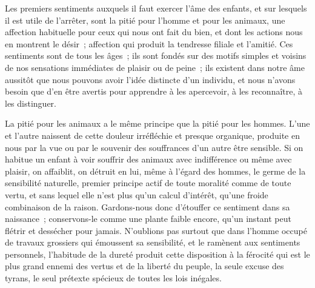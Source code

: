 	{Les premiers sentiments auxquels il faut exercer l'âme des enfants, et sur lesquels il est utile de l'arrêter, sont la pitié pour l'homme et pour les animaux, une affection habituelle pour ceux qui nous ont fait du bien, et dont les actions nous en montrent le désir~; affection qui produit la tendresse filiale et l'amitié. Ces sentiments sont de tous les âges~; ils sont fondés sur des motifs simples et voisins de nos sensations immédiates de plaisir ou de peine~; ils existent dans notre âme aussitôt que nous pouvons avoir l'idée distincte d'un individu, et nous n'avons besoin que d'en être avertis pour apprendre à les apercevoir, à les reconnaître, à les distinguer.
	
La pitié pour les animaux a le même principe que la pitié pour les hommes. L'une et l'autre naissent de cette douleur irréfléchie et presque organique, produite en nous par la vue ou par le souvenir des souffrances d'un autre être sensible. Si on habitue un enfant à voir souffrir des animaux avec indifférence ou même avec plaisir, on affaiblit, on détruit en lui, même à l'égard des hommes, le germe de la sensibilité naturelle, premier principe actif de toute moralité comme de toute vertu, et sans lequel elle n'est plus qu'un calcul d'intérêt, qu'une froide combinaison de la raison. Gardons-nous donc d'étouffer ce sentiment dans sa naissance~; conservons-le comme une plante faible encore, qu'un instant peut flétrir et dessécher pour jamais. N'oublions pas surtout que dans l'homme occupé de travaux grossiers qui émoussent sa sensibilité, et le ramènent aux sentiments personnels, l'habitude de la dureté produit cette disposition à la férocité qui est le plus grand ennemi des vertus et de la liberté du peuple, la seule excuse des tyrans, le seul prétexte spécieux de toutes les lois inégales.
}

